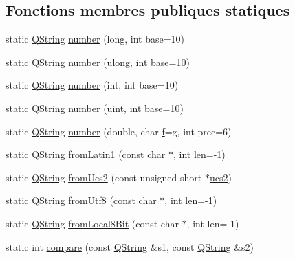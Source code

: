 \subsection*{Fonctions membres publiques statiques}
\begin{DoxyCompactItemize}
\item 
static \hyperlink{class_q_string}{Q\+String} \hyperlink{class_q_string_ac6eeb4543ef6aa8e4b165ed947039cd8}{number} (long, int base=10)
\item 
static \hyperlink{class_q_string}{Q\+String} \hyperlink{class_q_string_a8d0965cab4025b7babc1aaa7d84aeb69}{number} (\hyperlink{qglobal_8h_a718b4eb2652c286f4d42dc18a8e71a1a}{ulong}, int base=10)
\item 
static \hyperlink{class_q_string}{Q\+String} \hyperlink{class_q_string_ac00103ffd860cbe3448ace2b490800cf}{number} (int, int base=10)
\item 
static \hyperlink{class_q_string}{Q\+String} \hyperlink{class_q_string_a38addca1148502aad34f7ee85eb1d344}{number} (\hyperlink{qglobal_8h_a4d3943ddea65db7163a58e6c7e8df95a}{uint}, int base=10)
\item 
static \hyperlink{class_q_string}{Q\+String} \hyperlink{class_q_string_a653e603580c5e150e99997e12ddaddf5}{number} (double, char \hyperlink{060__command__switch_8tcl_af6830d2c644b45088ea8f1f74a46b778}{f}=\textquotesingle{}\hyperlink{060__command__switch_8tcl_af08b4b5bfa9edf0b0a7dee1c2b2c29e0}{g}\textquotesingle{}, int prec=6)
\item 
static \hyperlink{class_q_string}{Q\+String} \hyperlink{class_q_string_ab8e9aa9ff378aa3f3e531b26598712e3}{from\+Latin1} (const char $\ast$, int len=-\/1)
\item 
static \hyperlink{class_q_string}{Q\+String} \hyperlink{class_q_string_acc31424e78107f6f711db5a2b9f7b8f4}{from\+Ucs2} (const unsigned short $\ast$\hyperlink{class_q_string_a0bf17c41b18b61deb6c47b6e3d3791c8}{ucs2})
\item 
static \hyperlink{class_q_string}{Q\+String} \hyperlink{class_q_string_a3e1b40400c137f234bfd2fd73405bca7}{from\+Utf8} (const char $\ast$, int len=-\/1)
\item 
static \hyperlink{class_q_string}{Q\+String} \hyperlink{class_q_string_ad1175d375e2a8fee8e6411b855c63afb}{from\+Local8\+Bit} (const char $\ast$, int len=-\/1)
\item 
static int \hyperlink{class_q_string_ac8f4c4a5a71bab250e9021c6511269dd}{compare} (const \hyperlink{class_q_string}{Q\+String} \&s1, const \hyperlink{class_q_string}{Q\+String} \&s2)
\end{DoxyCompactItemize}
